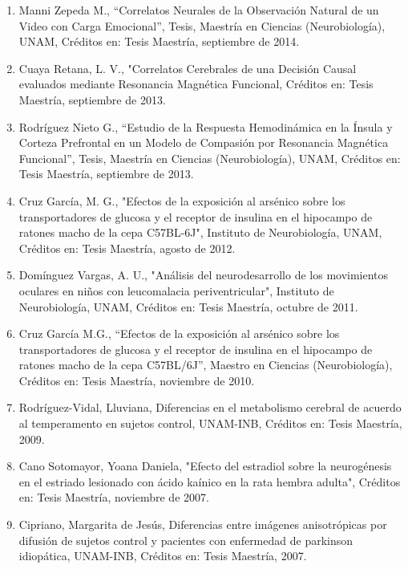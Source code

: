 \begin{enumerate}
\item Manni Zepeda M., “Correlatos Neurales de la Observación Natural de un Video con Carga Emocional”, Tesis, Maestría en 
Ciencias (Neurobiología), UNAM, Créditos en: Tesis Maestría, septiembre de 2014.

\item Cuaya Retana, L. V., "Correlatos Cerebrales de una Decisión Causal evaluados mediante Resonancia Magnética Funcional, 
Créditos en: Tesis Maestría, septiembre de 2013.

\item Rodríguez Nieto G., “Estudio de la Respuesta Hemodinámica en la Ínsula y Corteza Prefrontal en un Modelo de Compasión 
por Resonancia Magnética Funcional”, Tesis, Maestría en Ciencias (Neurobiología), UNAM, Créditos en: Tesis Maestría, 
septiembre de 2013.

\item Cruz García, M. G., "Efectos de la exposición al arsénico sobre los transportadores de glucosa y el receptor de 
insulina en el hipocampo de ratones macho de la cepa C57BL-6J", Instituto de Neurobiología, UNAM, Créditos en: Tesis 
Maestría, agosto de 2012.

\item Domínguez Vargas, A. U., "Análisis del neurodesarrollo de los movimientos oculares en niños con leucomalacia 
periventricular", Instituto de Neurobiología, UNAM, Créditos en: Tesis Maestría, octubre de 2011.

\item Cruz García M.G., “Efectos de la exposición al arsénico sobre los transportadores de glucosa y el receptor de 
insulina 
en el hipocampo de ratones macho de la cepa C57BL/6J”, Maestro en Ciencias (Neurobiología), Créditos en: Tesis Maestría, 
noviembre de 2010.

\item Rodríguez-Vidal, Lluviana, Diferencias en el metabolismo cerebral de acuerdo al temperamento en sujetos 
control, UNAM-INB, Créditos en: Tesis Maestría, 2009.

\item Cano Sotomayor, Yoana Daniela, "Efecto del estradiol sobre la neurogénesis en el estriado lesionado con ácido kaínico 
en la rata hembra adulta", Créditos en: Tesis Maestría, noviembre de 2007.

\item Cipriano, Margarita de Jesús, Diferencias entre imágenes anisotrópicas por difusión de sujetos control y pacientes 
con 
enfermedad de parkinson idiopática, UNAM-INB, Créditos en: Tesis Maestría, 2007.


\end{enumerate}
